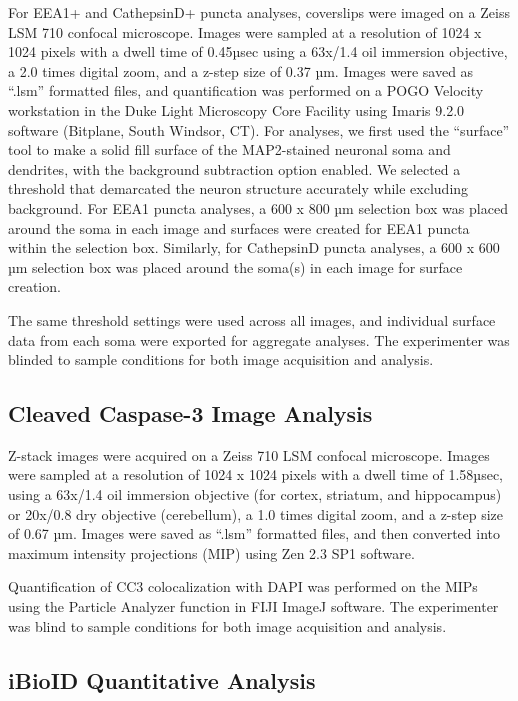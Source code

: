 For EEA1+ and CathepsinD+ puncta analyses, coverslips were imaged on a Zeiss LSM
710 confocal microscope. Images were sampled at a resolution of 1024 x 1024
pixels with a dwell time of 0.45µsec using a 63x/1.4 oil immersion objective, a
2.0 times digital zoom, and a z-step size of 0.37 µm. Images were saved as
“.lsm” formatted files, and quantification was performed on a POGO Velocity
workstation in the Duke Light Microscopy Core Facility using Imaris 9.2.0
software (Bitplane, South Windsor, CT). For analyses, we first used the
“surface” tool to make a solid fill surface of the MAP2-stained neuronal soma
and dendrites, with the background subtraction option enabled. We selected a
threshold that demarcated the neuron structure accurately while excluding
background. For EEA1 puncta analyses, a 600 x 800 µm selection box was placed
around the soma in each image and surfaces were created for EEA1 puncta within
the selection box. Similarly, for CathepsinD puncta analyses, a 600 x 600 µm
selection box was placed around the soma(s) in each image for surface creation.

The same threshold settings were used across all images, and individual surface
data from each soma were exported for aggregate analyses. The experimenter was
blinded to sample conditions for both image acquisition and analysis.

\subsection{Cleaved Caspase-3 Image Analysis}

Z-stack images were acquired on a Zeiss 710 LSM confocal microscope. Images were
sampled at a resolution of 1024 x 1024 pixels with a dwell time of 1.58µsec,
using a 63x/1.4 oil immersion objective (for cortex, striatum, and hippocampus)
or 20x/0.8 dry objective (cerebellum), a 1.0 times digital zoom, and a z-step
size of 0.67 µm. Images were saved as “.lsm” formatted files, and then converted
into maximum intensity projections (MIP) using Zen 2.3 SP1 software.

Quantification of CC3 colocalization with DAPI was performed on the MIPs using
the Particle Analyzer function in FIJI ImageJ software. The experimenter was
blind to sample conditions for both image acquisition and analysis.

\subsection{iBioID Quantitative Analysis}

